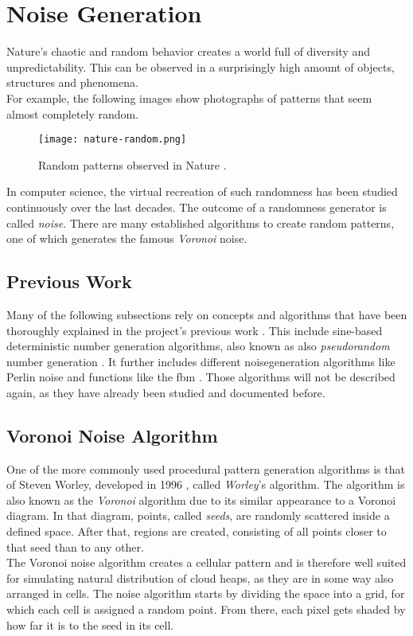 \section{Noise Generation}
\label{section:noise}
Nature's chaotic and random behavior creates a world full of diversity and unpredictability.
This can be observed in a surprisingly high amount of objects, structures and phenomena.
\\
For example, the following images show photographs of patterns that seem almost completely random.

\begin{figure}[H]
    \texttt{[image: nature-random.png]}
    \caption{Random patterns observed in Nature \protect\cite{bookofshaders:noise}.}
    \label{img:rnd:natural}
\end{figure}

\noindent
In computer science, the virtual recreation of such randomness has been studied continuously over the last decades.
The outcome of a randomness generator is called \emph{\gls{noise}}.
There are many established algorithms to create random patterns, one of which generates the famous \emph{Voronoi} \gls{noise}.

\subsection{Previous Work}
\label{section:noise:previous}
Many of the following subsections rely on concepts and algorithms that have been thoroughly explained in the project's previous work \cite{project2:noise}.
This include sine-based deterministic number generation algorithms, also known as also \emph{\gls{pseudorandom}} number generation \cite{project2:noise:pseudo}.
It further includes different \gls{noisegeneration} algorithms like Perlin \gls{noise} \cite{project2:noise:perlin} and functions like the \gls{fbm} \cite{project2:noise:fbm}.
\emptyline
Those algorithms will not be described again, as they have already been studied and documented before.

\pagebreak

\subsection{Voronoi Noise Algorithm}
\label{section:noise:voronoi}
One of the more commonly used procedural pattern generation algorithms is that of Steven Worley, developed in 1996 \cite{worley}, called \emph{Worley}'s algorithm.
The algorithm is also known as the \emph{Voronoi} algorithm due to its similar appearance to a Voronoi diagram.
In that diagram, points, called \emph{seeds}, are randomly scattered inside a defined space.
After that, regions are created, consisting of all points closer to that seed than to any other.
\\
The Voronoi \gls{noise} algorithm creates a cellular pattern and is therefore well suited for simulating natural distribution of cloud heaps, as they are in some way also arranged in cells.
\emptyline
The \gls{noise} algorithm starts by dividing the space into a grid, for which each cell is assigned a random point.
From there, each pixel gets shaded by how far it is to the seed in its cell.

